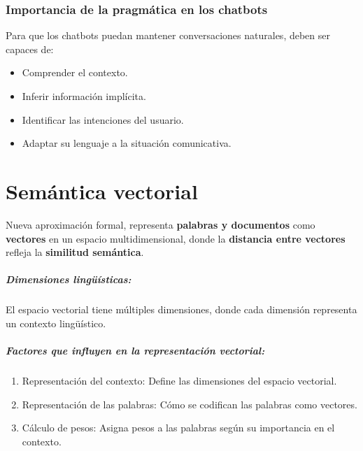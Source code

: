 \documentclass{report}
\def\profundidadIndiceCapitulo{subsubsection}
\begin{document}
\subsection{Importancia de la pragmática en los chatbots}
Para que los chatbots puedan mantener conversaciones naturales, deben ser capaces de:

\begin{itemize}
    \item Comprender el contexto.
    \item Inferir información implícita.
    \item Identificar las intenciones del usuario.
    \item Adaptar su lenguaje a la situación comunicativa.
\end{itemize}


\chapter{Semántica vectorial}
\etocframedstyle[1]{}
\etocsetnexttocdepth{\profundidadIndiceCapitulo}
\localtableofcontents

Nueva aproximación formal, representa \textbf{palabras y documentos} como \textbf{vectores} en un espacio multidimensional, donde la \textbf{distancia entre vectores} refleja la \textbf{similitud semántica}. 

\paragraph{Dimensiones lingüísticas:} El espacio vectorial tiene múltiples dimensiones, donde cada dimensión representa un contexto lingüístico. 

\paragraph{Factores que influyen en la representación vectorial:}
\begin{enumerate}
    \item Representación del contexto: Define las dimensiones del espacio vectorial.
    \item Representación de las palabras: Cómo se codifican las palabras como vectores.
    \item Cálculo de pesos: Asigna pesos a las palabras según su importancia en el contexto.
\end{enumerate}
\end{document}
